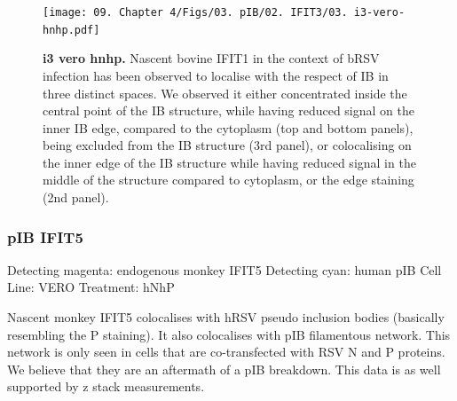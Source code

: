 \begin{figure}
    \centering
    \texttt{[image: 09. Chapter 4/Figs/03. pIB/02. IFIT3/03. i3-vero-hnhp.pdf]}
    \caption[i3 vero hnhp]{\textbf{i3 vero hnhp.} Nascent bovine IFIT1 in the context of bRSV infection has been observed to localise with the respect of IB in three distinct spaces. We observed it either concentrated inside the central point of the IB structure, while having reduced signal on the inner IB edge, compared to the cytoplasm (top and bottom panels), being excluded from the IB structure (3rd panel), or colocalising on the inner edge of the IB structure while having reduced signal in the middle of the structure compared to cytoplasm, or the edge staining (2nd panel).}
    \label{fig:i3 vero hnhp}
\end{figure}

\subsubsection{pIB IFIT5}
Detecting magenta: endogenous monkey IFIT5 \newline
Detecting cyan: human pIB \newline
Cell Line: VERO \newline
Treatment: hNhP \newline

Nascent monkey IFIT5 colocalises with hRSV pseudo inclusion bodies (basically resembling the P staining). It also colocalises with pIB filamentous network. This network is only seen in cells that are co-transfected with RSV N and P proteins. We believe that they are an aftermath of a pIB breakdown. This data is as well supported by z stack measurements.

